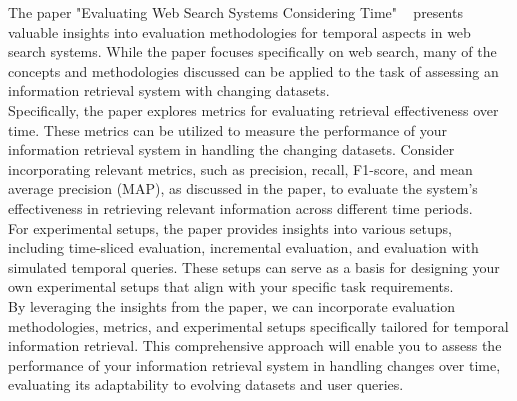 The paper "Evaluating Web Search Systems Considering Time" ~\cite{hofmann2014evaluating} presents valuable insights into evaluation methodologies for temporal aspects 
in web search systems. While the paper focuses specifically on web search, many of the concepts and 
methodologies discussed can be applied to the task of assessing an information retrieval system with 
changing datasets. \\

Specifically, the paper explores metrics for evaluating retrieval effectiveness over time. These metrics 
can be utilized to measure the performance of your information retrieval system in handling the changing 
datasets. Consider incorporating relevant metrics, such as precision, recall, F1-score, and mean average 
precision (MAP), as discussed in the paper, to evaluate the system's effectiveness in retrieving relevant 
information across different time periods.\\

For experimental setups, the paper provides insights into various setups, including time-sliced evaluation, 
incremental evaluation, and evaluation with simulated temporal queries. These setups can serve as a basis 
for designing your own experimental setups that align with your specific task requirements.\\

By leveraging the insights from the paper, we can incorporate evaluation methodologies, metrics, and
experimental setups specifically tailored for temporal information retrieval. 
This comprehensive approach will enable you to assess the performance of your information retrieval 
system in handling changes over time, evaluating its adaptability to evolving datasets and user queries.\\
